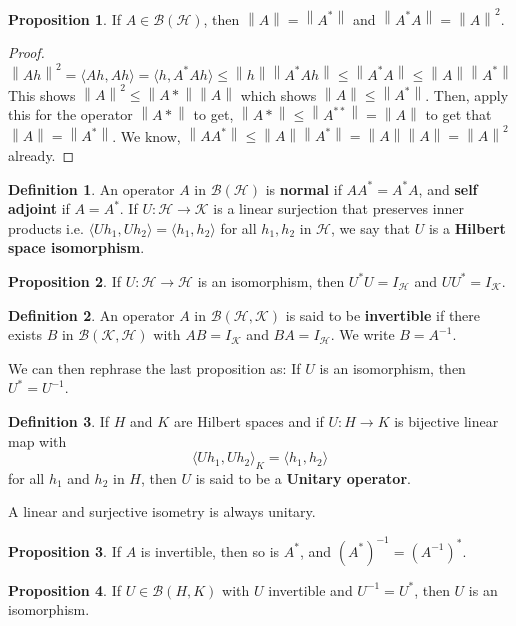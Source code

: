 \documentclass{article}
\theoremstyle{definition}
\newtheorem*{defn}{Definition}
\newtheorem{proposition}{Proposition}
\newcommand{\norm}[1]{\left\lVert#1\right\rVert}
\begin{document}
    \begin{proposition}
        If $A\in\mathcal{B}(\mathcal{H})$, then $\norm{A}=\norm{A^*}$ and $\norm{A^*A} = \norm{A}^2$.
    \end{proposition}
    \begin{proof}
        \[ \norm{Ah}^2 = \langle Ah, Ah\rangle = \langle h, A^*Ah\rangle \leq \norm{h}\norm{A^*Ah} \leq \norm{A^*A} \leq 
            \norm{A}\norm{A^*} \]
        This shows $\norm{A}^2 \leq \norm{A*}\norm{A}$ which shows $\norm{A}\leq \norm{A^*}$. Then, apply this for the operator
        $\norm{A*}$ to get, $\norm{A*}\leq \norm{A^{**}} = \norm{A}$ to get that $\norm{A} = \norm{A^*}$. We know,
        $\norm{AA^*} \leq \norm{A}\norm{A^*} = \norm{A}\norm{A} = \norm{A}^2$ already. 
    \end{proof}

    \begin{defn}
        An operator $A$ in $\mathcal{B}(\mathcal{H})$ is \textbf{normal} if $AA^* = A^*A$, and \textbf{self adjoint} if $A=A^*$.
        If $U:\mathcal{H}\to\mathcal{K}$ is a linear surjection that preserves inner products i.e. $\langle Uh_1,Uh_2\rangle =
        \langle h_1,h_2\rangle$ for all $h_1,h_2$ in $\mathcal{H}$, we say that $U$ is a \textbf{Hilbert space isomorphism}.
    \end{defn}

    \begin{proposition}
        If $U:\mathcal{H}\to\mathcal{H}$ is an isomorphism, then $U^*U= I_{\mathcal{H}}$ and $UU^* = I_{\mathcal{K}}$.
    \end{proposition}

    \begin{defn}
        An operator $A$ in $\mathcal{B}(\mathcal{H},\mathcal{K})$ is said to be \textbf{invertible} if there exists $B$ in
        $\mathcal{B}(\mathcal{K},\mathcal{H})$ with $AB = I_{\mathcal{K}}$ and $BA = I_{\mathcal{H}}$. We write $B = A^{-1}$.
    \end{defn}

    We can then rephrase the last proposition as: If $U$ is an isomorphism, then $U^* = U^{-1}$.

    \begin{defn}
        If $H$ and $K$ are Hilbert spaces and if $U:H\to K$ is bijective linear map with
        \[ \langle Uh_1,Uh_2\rangle_K = \langle h_1,h_2\rangle \]
        for all $h_1$ and $h_2$ in $H$, then $U$ is said to be a \textbf{Unitary operator}.
    \end{defn}

    A linear and surjective isometry is always unitary.

    \begin{proposition}
        If $A$ is invertible, then so is $A^*$, and $(A^*)^{-1} = (A^{-1})^*$.
    \end{proposition}

    \begin{proposition}
        If $U\in\mathcal{B}(H,K)$ with $U$ invertible and $U^{-1} = U^*$, then $U$ is an isomorphism.
    \end{proposition}
\end{document}
